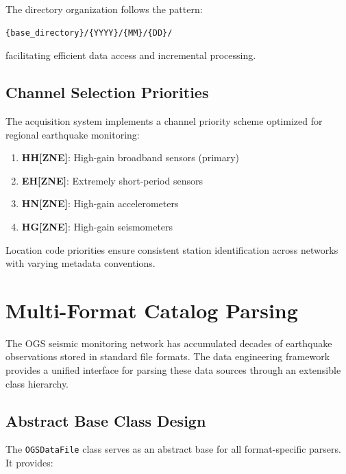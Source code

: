 The directory organization follows the pattern:
\begin{verbatim}
{base_directory}/{YYYY}/{MM}/{DD}/
\end{verbatim}
facilitating efficient data access and incremental processing.

\subsection{Channel Selection Priorities}
\label{subsec:ChannelPriorities}
The acquisition system implements a channel priority scheme optimized for
regional earthquake monitoring:

\begin{enumerate}
  \item \textbf{HH[ZNE]}: High-gain broadband sensors (primary)
  \item \textbf{EH[ZNE]}: Extremely short-period sensors
  \item \textbf{HN[ZNE]}: High-gain accelerometers
  \item \textbf{HG[ZNE]}: High-gain seismometers
\end{enumerate}

Location code priorities ensure consistent station identification across
networks with varying metadata conventions.

\section{Multi-Format Catalog Parsing}

The OGS seismic monitoring network has accumulated decades of earthquake
observations stored in standard file formats. The data engineering
framework provides a unified interface for parsing these data sources through
an extensible class hierarchy.

\subsection{Abstract Base Class Design}
The \texttt{OGSDataFile} class serves as an abstract base for all
format-specific parsers. It provides:


